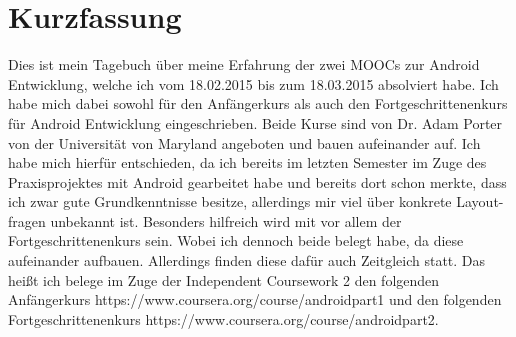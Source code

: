 \documentclass[12pt,a4paper,bibliography=totocnumbered,listof=totocnumbered]{scrartcl}
\begin{document}
\setcounter{page}{1}
\onehalfspacing
{}
\section{Kurzfassung}
Dies ist mein Tagebuch über meine Erfahrung der zwei MOOCs zur Android Entwicklung, welche ich vom 18.02.2015 bis zum 18.03.2015 absolviert habe. \newline
Ich habe mich dabei sowohl für den Anfängerkurs als auch den Fortgeschrittenenkurs für Android Entwicklung eingeschrieben.    
Beide Kurse sind von Dr. Adam Porter von der Universität von Maryland angeboten und bauen aufeinander auf.\newline
Ich habe mich hierfür entschieden, da ich bereits im letzten Semester im Zuge des Praxisprojektes mit Android gearbeitet habe und bereits dort schon merkte, dass ich zwar gute Grundkenntnisse besitze, allerdings mir viel über konkrete Layout-fragen unbekannt ist. Besonders hilfreich wird mit vor allem der Fortgeschrittenenkurs sein. Wobei ich dennoch beide belegt habe, da diese aufeinander aufbauen. Allerdings finden diese dafür auch Zeitgleich statt.\newline
Das heißt ich belege im Zuge der Independent Coursework 2 den folgenden Anfängerkurs \textcolor[rgb]{0,0,1}{https://www.coursera.org/course/androidpart1} und den folgenden Fortgeschrittenenkurs \textcolor[rgb]{0,0,1}{https://www.coursera.org/course/androidpart2}.

\pagebreak

\renewcommand{\cfttabpresnum}{Tab. }
\renewcommand{\cftfigpresnum}{Abb. }
\settowidth{\cfttabnumwidth}{Abb. 10\quad}
\settowidth{\cftfignumwidth}{Abb. 10\quad}

\singlespacing
{}
\renewcommand{\contentsname}{II Inhaltsverzeichnis}
{}
\addtocounter{section}{1}
\tableofcontents
\pagebreak
{}
\listoffigures
\pagebreak
\listoftables
\renewcommand{\lstlistlistingname}{Listing-Verzeichnis}
{\lstlistoflistings}
\pagebreak
\end{document}
